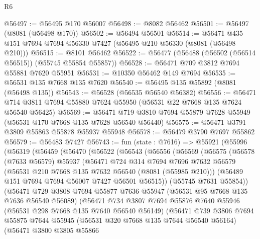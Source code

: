 \begin{lexlean}{R6}
\begin{coremodule}
@56497 := @56495 @170 @56007
@56498 := @8082 @56462
@56501 := @56497 (@8081 (@56498 @170))
@56502 := @56494 @56501
@56514 := @56471 @435 @151 @7694 @7694 @56330 @7427 (@56495 @210 @56330 (@8081 (@56498 @210)))
@56515 := @8101 @56462
@56522 := @56477 (@56488 (@56502 (@56514 @56515)) (@55745 @55854 @55857))
@56528 := @56471 @709 @3812 @7694 @55881 @7620 @55951
@56531 := @10350 @56462 @149 @7694
@56535 := @56531 @135 @7668 @135 @7620
@56540 := @56495 @135 @55892 (@8081 (@56498 @135))
@56543 := @56528 (@56535 @56540 @56382)
@56556 := @56471 @714 @3811 @7694 @55880 @7624 @55950 (@56531 @22 @7668 @135 @7624 @56540 @56425)
@56569 := @56471 @719 @3810 @7694 @55879 @7628 @55949 (@56531 @170 @7668 @135 @7628 @56540 @56440)
@56575 := @56471 @3791 @3809 @55863 @55878 @55937 @55948
@56578 := @56479 @3790 @7697 @55862
@56579 := @56483 @7427
@56743 := fun (state : @7616) =>
  @55921
    (@55996
      (@56319
        (@56459
          (@56470
            (@56522
              (@56543
                (@56556
                  (@56569
                    (@56575
                      (@56578
                        (@7633 @56579)
                        @55937
                        (@56471
                          @724
                          @314
                          @7694
                          @7696
                          @7632
                          @56579
                          (@56531 @210 @7668 @135 @7632 @56540 (@8081 (@55985 @210)))
                          (@56489 @151 @7694 @7694 @56007 @7427 @56501 @56515))
                        (@55745 @7631 @55854))
                      (@56471
                        @729
                        @3808
                        @7694
                        @55877
                        @7636
                        @55947
                        (@56531 @95 @7668 @135 @7636 @56540 @56089)
                        (@56471
                          @734
                          @3807
                          @7694
                          @55876
                          @7640
                          @55946
                          (@56531 @298 @7668 @135 @7640 @56540 @56149)
                          (@56471
                            @739
                            @3806
                            @7694
                            @55875
                            @7644
                            @55945
                            (@56531 @320 @7668 @135 @7644 @56540 @56164)
                            (@56471
                              @3800
                              @3805
                              @55866

\end{coremodule}
\end{lexlean}
